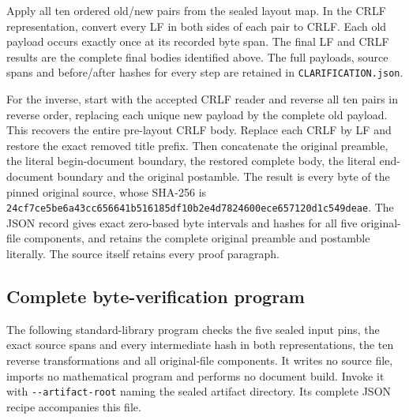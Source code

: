 Apply all ten ordered old/new pairs from the sealed layout map. In the
CRLF representation, convert every LF in both sides of each pair to CRLF.
Each old payload occurs exactly once at its recorded byte span. The final
LF and CRLF results are the complete final bodies identified above.
The full payloads, source spans and before/after hashes for every step are
retained in \nolinkurl{CLARIFICATION.json}.

For the inverse, start with the accepted CRLF reader and reverse all ten
pairs in reverse order, replacing each unique new payload by the complete
old payload. This recovers the entire pre-layout CRLF body. Replace each
CRLF by LF and restore the exact removed title prefix. Then concatenate
the original preamble, the literal begin-document boundary, the restored
complete body, the literal end-document boundary and the original
postamble. The result is every byte of the pinned original source,
whose SHA-256 is
\nolinkurl{24cf7ce5be6a43cc656641b516185df10b2e4d7824600ece657120d1c549deae}.
The JSON record gives exact zero-based byte intervals and hashes for all
five original-file components, and retains the complete original preamble
and postamble literally. The source itself retains every proof paragraph.

\subsection{Complete byte-verification program}
The following standard-library program checks the five sealed input pins,
the exact source spans and every intermediate hash in both representations,
the ten reverse transformations and all original-file components. It
writes no source file, imports no mathematical program and performs no
document build. Invoke it with \nolinkurl{--artifact-root} naming the
sealed artifact directory. Its complete JSON recipe accompanies this file.

\endgroup
